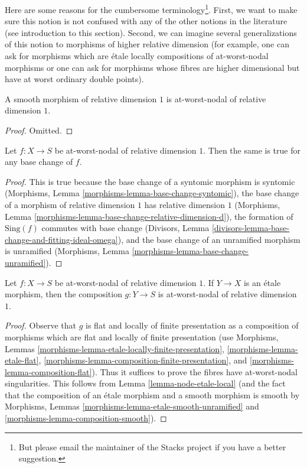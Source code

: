 \noindent
Here are some reasons for the cumbersome terminology\footnote{But please
email the maintainer of the Stacks project if you have a better suggestion.}.
First, we want to make sure this notion is not confused with any of the
other notions in the literature (see introduction to this section).
Second, we can imagine several generalizations of this notion to morphisms
of higher relative dimension (for example, one can ask for morphisms
which are \'etale locally compositions of at-worst-nodal morphisms or
one can ask for morphisms whose fibres are higher dimensional but have
at worst ordinary double points).

\begin{lemma}
\label{lemma-smooth-relative-dimension-1}
A smooth morphism of relative dimension $1$ is
at-worst-nodal of relative dimension $1$.
\end{lemma}

\begin{proof}
Omitted.
\end{proof}

\begin{lemma}
\label{lemma-base-change-nodal-family}
Let $f : X \to S$ be at-worst-nodal of relative dimension $1$.
Then the same is true for any base change of $f$.
\end{lemma}

\begin{proof}
This is true because the base change of a syntomic morphism
is syntomic (Morphisms, Lemma \ref{morphisms-lemma-base-change-syntomic}),
the base change of a morphism of relative dimension $1$ has
relative dimension $1$
(Morphisms, Lemma \ref{morphisms-lemma-base-change-relative-dimension-d}),
the formation of $\text{Sing}(f)$ commutes with base change
(Divisors, Lemma
\ref{divisors-lemma-base-change-and-fitting-ideal-omega}), and
the base change of an unramified morphism is unramified
(Morphisms, Lemma \ref{morphisms-lemma-base-change-unramified}).
\end{proof}

\begin{lemma}
\label{lemma-nodal-family-precompose-etale}
Let $f : X \to S$ be at-worst-nodal of relative dimension $1$.
If $Y \to X$ is an \'etale morphism, then the composition $g : Y \to S$
is at-worst-nodal of relative dimension $1$.
\end{lemma}

\begin{proof}
Observe that $g$ is flat and locally of finite presentation as
a composition of morphisms which are flat and locally of finite
presentation (use
Morphisms, Lemmas \ref{morphisms-lemma-etale-locally-finite-presentation},
\ref{morphisms-lemma-etale-flat},
\ref{morphisms-lemma-composition-finite-presentation}, and
\ref{morphisms-lemma-composition-flat}).
Thus it suffices to prove the fibres have at-worst-nodal singularities.
This follows from Lemma \ref{lemma-node-etale-local}
(and the fact that the composition of an \'etale morphism and
a smooth morphism is smooth by
Morphisms, Lemmas \ref{morphisms-lemma-etale-smooth-unramified} and
\ref{morphisms-lemma-composition-smooth}).
\end{proof}

